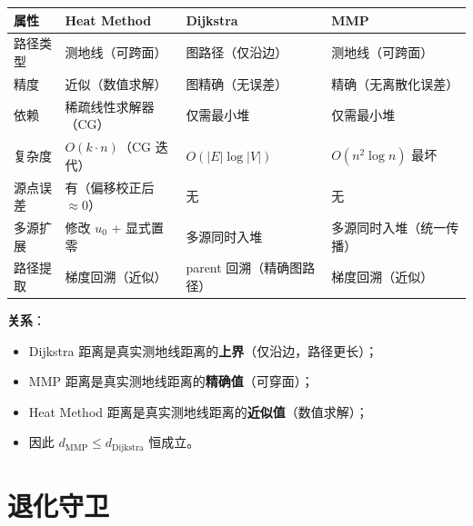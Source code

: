 \documentclass[11pt,a4paper]{article}
\begin{document}
\begin{center}
\renewcommand{\arraystretch}{1.18}
\begin{tabular}{@{}p{2.8cm}p{3.8cm}p{3.8cm}p{3.8cm}@{}}
  \toprule
  \textbf{属性} & \textbf{Heat Method} & \textbf{Dijkstra} & \textbf{MMP} \\
  \midrule
  路径类型 & 测地线（可跨面） & 图路径（仅沿边） & 测地线（可跨面） \\
  精度 & 近似（数值求解） & 图精确（无误差） & 精确（无离散化误差） \\
  依赖 & 稀疏线性求解器（CG） & 仅需最小堆 & 仅需最小堆 \\
  复杂度 & $O(k \cdot n)$（CG 迭代） & $O(|E|\log|V|)$ & $O(n^2 \log n)$ 最坏 \\
  源点误差 & 有（偏移校正后 $\approx 0$） & 无 & 无 \\
  多源扩展 & 修改 $u_0$ + 显式置零 & 多源同时入堆 & 多源同时入堆（统一传播） \\
  路径提取 & 梯度回溯（近似） & parent 回溯（精确图路径） & 梯度回溯（近似） \\
  \bottomrule
\end{tabular}
\end{center}

\textbf{关系}：
\begin{itemize}
  \item Dijkstra 距离是真实测地线距离的\textbf{上界}（仅沿边，路径更长）；
  \item MMP 距离是真实测地线距离的\textbf{精确值}（可穿面）；
  \item Heat Method 距离是真实测地线距离的\textbf{近似值}（数值求解）；
  \item 因此 $d_{\text{MMP}} \le d_{\text{Dijkstra}}$ 恒成立。
\end{itemize}

\section{退化守卫}
\end{document}
